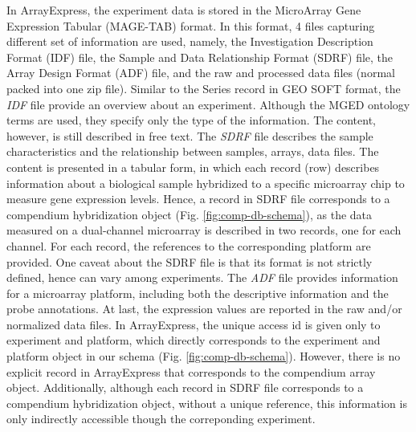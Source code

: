 %
In ArrayExpress, the experiment data is stored in the MicroArray Gene
Expression Tabular (MAGE-TAB) format.
%
In this format, 4 files capturing different set of information are used,
namely, the Investigation Description Format (IDF) file, the Sample and Data
Relationship Format (SDRF) file, the Array Design Format (ADF) file, and the
raw and processed data files (normal packed into one zip file).
%
Similar to the Series record in GEO SOFT format, the \textit{IDF} file provide
an overview about an experiment.
%
Although the MGED ontology terms are used, they specify only the type of the
information.  The content, however, is still described in free text.
%
The \textit{SDRF} file describes the sample characteristics and the
relationship between samples, arrays, data files.
%
The content is presented in a tabular form, in which each record (row)
describes information about a biological sample hybridized to a specific
microarray chip to measure gene expression levels. 
%
Hence, a record in SDRF file corresponds to a compendium hybridization
object (Fig. \ref{fig:comp-db-schema}), as the data measured on a
dual-channel microarray is described in two records, one for each channel.
%
For each record, the references to the corresponding platform are
provided.
%
One caveat about the SDRF file is that its format is not strictly defined,
hence can vary among experiments.
%
The \textit{ADF} file provides information for a microarray platform,
including both the descriptive information and the probe annotations.
%
At last, the expression values are reported in the raw and/or normalized
data files.
%
In ArrayExpress, the unique access id is given only to experiment and
platform, which directly corresponds to the experiment and platform object
in our schema (Fig. \ref{fig:comp-db-schema}).
%
However, there is no explicit record in ArrayExpress that corresponds to
the compendium array object.  Additionally, although each record in SDRF
file corresponds to a compendium hybridization object, without a unique
reference, this information is only indirectly accessible though the
correponding experiment.
%


